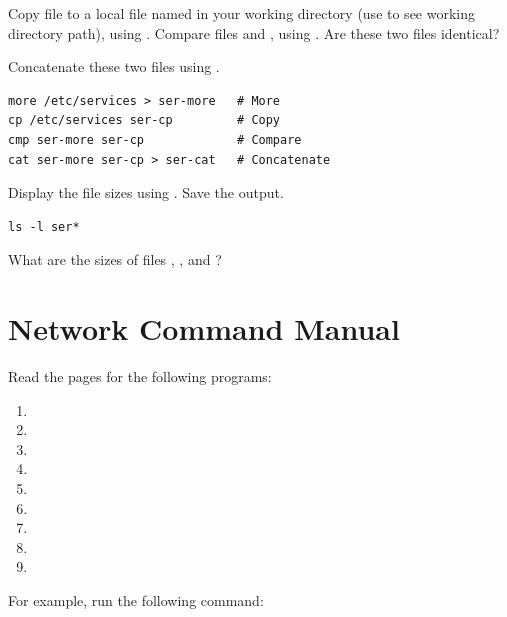 \documentclass{../UTNetLab}
\begin{document}
Copy  file to a local file named  in your working directory (use  to see working directory path),
using .
Compare files  and , using .
Are these two files identical?

Concatenate these two files using .

\begin{lstlisting}
more /etc/services > ser-more   # More
cp /etc/services ser-cp         # Copy
cmp ser-more ser-cp             # Compare
cat ser-more ser-cp > ser-cat   # Concatenate
\end{lstlisting}

Display the file sizes using .
Save the output.

\begin{lstlisting}
ls -l ser*
\end{lstlisting}

\begin{report}
    \item What are the sizes of files , , and ?
\end{report}

\section{Network Command Manual}
Read the  pages for the following programs:
\begin{multicols}{3}
    \begin{enumerate}
        \item {}
        \item {}
        \item {}
        \item {}
        \item {}
        \item {}
        \item {}
        \item {}
        \item {}
    \end{enumerate}
\end{multicols}

For example,  run the following command:
\end{document}
